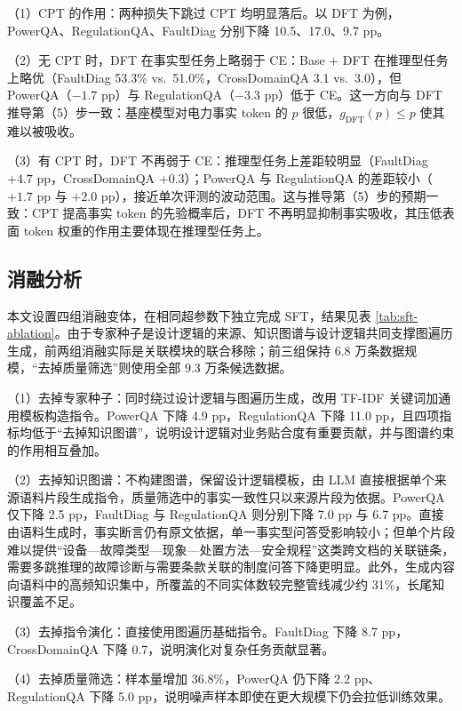 \documentclass[fontset=fandol,type=master,campus=shenzhen,etitleauto=true]{hithesisbook}
\begin{document}
（1）CPT 的作用：两种损失下跳过 CPT 均明显落后。以 DFT 为例，PowerQA、RegulationQA、FaultDiag 分别下降 10.5、17.0、9.7 pp。

（2）无 CPT 时，DFT 在事实型任务上略弱于 CE：Base + DFT 在推理型任务上略优（FaultDiag 53.3\% vs.\ 51.0\%，CrossDomainQA 3.1 vs.\ 3.0），但 PowerQA（$-1.7$ pp）与 RegulationQA（$-3.3$ pp）低于 CE。这一方向与 DFT 推导第（5）步一致：基座模型对电力事实 token 的 $p$ 很低，$g_{\text{DFT}}(p) \le p$ 使其难以被吸收。

（3）有 CPT 时，DFT 不再弱于 CE：推理型任务上差距较明显（FaultDiag $+4.7$ pp，CrossDomainQA $+0.3$）；PowerQA 与 RegulationQA 的差距较小（$+1.7$ pp 与 $+2.0$ pp），接近单次评测的波动范围。这与推导第（5）步的预期一致：CPT 提高事实 token 的先验概率后，DFT 不再明显抑制事实吸收，其压低表面 token 权重的作用主要体现在推理型任务上。

\subsection{消融分析}\label{ux6d88ux878dux5206ux6790}

本文设置四组消融变体，在相同超参数下独立完成 SFT，结果见表 \ref{tab:sft-ablation}。由于专家种子是设计逻辑的来源、知识图谱与设计逻辑共同支撑图遍历生成，前两组消融实际是关联模块的联合移除；前三组保持 6.8 万条数据规模，“去掉质量筛选”则使用全部 9.3 万条候选数据。

（1）去掉专家种子：同时绕过设计逻辑与图遍历生成，改用 TF-IDF 关键词加通用模板构造指令。PowerQA 下降 4.9 pp，RegulationQA 下降 11.0 pp，且四项指标均低于“去掉知识图谱”，说明设计逻辑对业务贴合度有重要贡献，并与图谱约束的作用相互叠加。

（2）去掉知识图谱：不构建图谱，保留设计逻辑模板，由 LLM 直接根据单个来源语料片段生成指令，质量筛选中的事实一致性只以来源片段为依据。PowerQA 仅下降 2.5 pp，FaultDiag 与 RegulationQA 则分别下降 7.0 pp 与 6.7 pp。直接由语料生成时，事实断言仍有原文依据，单一事实型问答受影响较小；但单个片段难以提供“设备—故障类型—现象—处置方法—安全规程”这类跨文档的关联链条，需要多跳推理的故障诊断与需要条款关联的制度问答下降更明显。此外，生成内容向语料中的高频知识集中，所覆盖的不同实体数较完整管线减少约 31\%，长尾知识覆盖不足。

（3）去掉指令演化：直接使用图遍历基础指令。FaultDiag 下降 8.7 pp，CrossDomainQA 下降 0.7，说明演化对复杂任务贡献显著。

（4）去掉质量筛选：样本量增加 36.8\%，PowerQA 仍下降 2.2 pp、RegulationQA 下降 5.0 pp，说明噪声样本即使在更大规模下仍会拉低训练效果。
\end{document}
